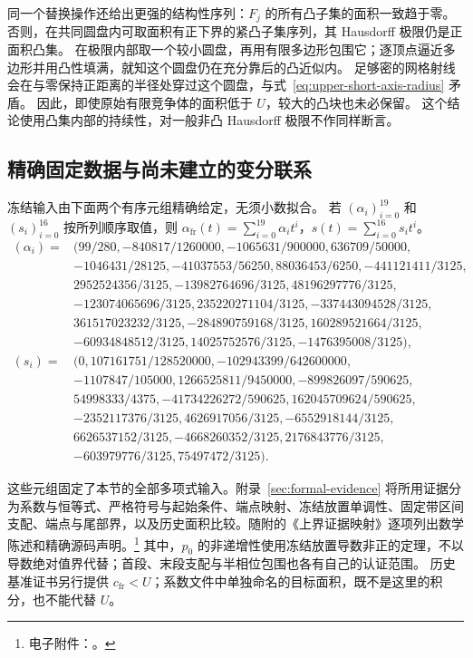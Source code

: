 同一个替换操作还给出更强的结构性序列：$F_j$ 的所有凸子集的面积一致趋于零。
否则，在共同圆盘内可取面积有正下界的紧凸子集序列，其 Hausdorff 极限仍是正面积凸集。
在极限内部取一个较小圆盘，再用有限多边形包围它；逐顶点逼近多边形并用凸性填满，就知这个圆盘仍在充分靠后的凸近似内。
足够密的网格射线会在与零保持正距离的半径处穿过这个圆盘，与式~\eqref{eq:upper-short-axis-radius} 矛盾。
因此，即使原始有限竞争体的面积低于 $U$，较大的凸块也未必保留。
这个结论使用凸集内部的持续性，对一般非凸 Hausdorff 极限不作同样断言。

\subsection{精确固定数据与尚未建立的变分联系}
\label{subsec:upper-evidence}

冻结输入由下面两个有序元组精确给定，无须小数拟合。
若 $(\alpha_i)_{i=0}^{19}$ 和 $(s_i)_{i=0}^{16}$ 按所列顺序取值，则
$\alpha_{\mathrm{fr}}(t)=\sum_{i=0}^{19}\alpha_i t^i$，$s(t)=\sum_{i=0}^{16}s_i t^i$。
\begingroup\small
\begin{align*}
(\alpha_i)={}&\bigl(99/280,-840817/1260000,-1065631/900000,636709/50000,\\
 &-1046431/28125,-41037553/56250,88036453/6250,-441121411/3125,\\
 &2952524356/3125,-13982764696/3125,48196297776/3125,\\
 &-123074065696/3125,235220271104/3125,-337443094528/3125,\\
 &361517023232/3125,-284890759168/3125,160289521664/3125,\\
 &-60934848512/3125,14025752576/3125,-1476395008/3125\bigr),\\[2mm]
(s_i)={}&\bigl(0,107161751/128520000,-102943399/642600000,\\
 &-1107847/105000,1266525811/9450000,-899826097/590625,\\
 &54998333/4375,-41734226272/590625,162045709624/590625,\\
 &-2352117376/3125,4626917056/3125,-6552918144/3125,\\
 &6626537152/3125,-4668260352/3125,2176843776/3125,\\
 &-603979776/3125,75497472/3125\bigr).
\end{align*}
\endgroup

这些元组固定了本节的全部多项式输入。附录~\ref{sec:formal-evidence} 将所用证据分为系数与恒等式、严格符号与起始条件、端点映射、冻结放置单调性、固定带区间支配、端点与尾部界，以及历史面积比较。随附的《上界证据映射》逐项列出数学陈述和精确源码声明。\footnote{电子附件：\texttt{}。}
其中，$p_0$ 的非递增性使用冻结放置导数非正的定理，不以导数绝对值界代替；首段、末段支配与半相位包围也各有自己的认证范围。
历史基准证书另行提供 $c_{\mathrm{fr}}<U$；系数文件中单独命名的目标面积，既不是这里的积分，也不能代替 $U$。

